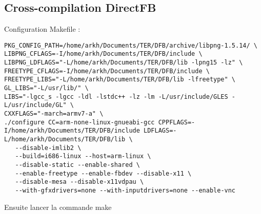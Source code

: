 \subsection{Cross-compilation DirectFB}

Configuration Makefile :

\begin{lstlisting}
PKG_CONFIG_PATH=/home/arkh/Documents/TER/DFB/archive/libpng-1.5.14/ \
LIBPNG_CFLAGS=-I/home/arkh/Documents/TER/DFB/include \
LIBPNG_LDFLAGS="-L/home/arkh/Documents/TER/DFB/lib -lpng15 -lz" \
FREETYPE_CFLAGS=-I/home/arkh/Documents/TER/DFB/include \
FREETYPE_LIBS="-L/home/arkh/Documents/TER/DFB/lib -lfreetype" \
GL_LIBS="-L/usr/lib/" \
LIBS="-lgcc_s -lgcc -ldl -lstdc++ -lz -lm -L/usr/include/GLES -L/usr/include/GL" \
CXXFLAGS="-march=armv7-a" \
./configure CC=arm-none-linux-gnueabi-gcc CPPFLAGS=-I/home/arkh/Documents/TER/DFB/include LDFLAGS=-L/home/arkh/Documents/TER/DFB/lib \
   --disable-imlib2 \
   --build=i686-linux --host=arm-linux \
   --disable-static --enable-shared \
   --enable-freetype --enable-fbdev --disable-x11 \
   --disable-mesa --disable-x11vdpau \
   --with-gfxdrivers=none --with-inputdrivers=none --enable-vnc
\end{lstlisting}

Ensuite lancer la commande make

